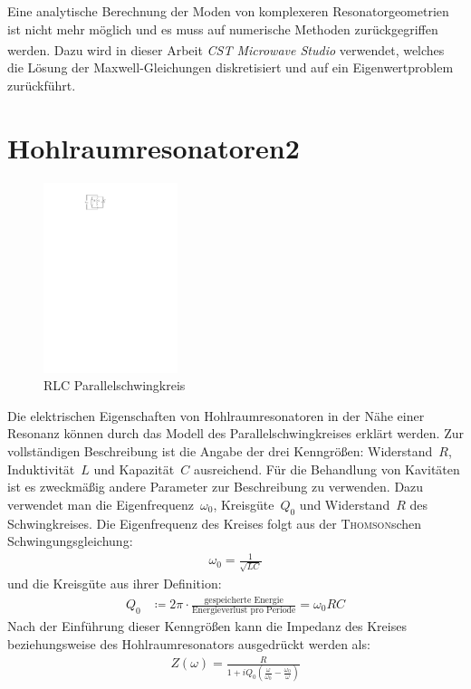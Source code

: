 \documentclass[11pt, a4paper]{scrbook}
\begin{document}
	Eine analytische Berechnung der Moden von komplexeren Resonatorgeometrien ist nicht mehr möglich und es muss auf numerische Methoden zurückgegriffen werden.
	Dazu wird in dieser Arbeit \emph{CST Microwave Studio\textsuperscript{\textregistered}} verwendet, welches die Lösung der Maxwell-Gleichungen diskretisiert und auf ein Eigenwertproblem zurückführt.
	
	\section{Hohlraumresonatoren2}
	\begin{figure}[h]
		\centering
		\includegraphics[width=0.35\textwidth]{./figures/RLC_circuit.pdf}
		\caption{RLC Parallelschwingkreis}
		\label{fig:rlc_circuit}
	\end{figure}
	Die elektrischen Eigenschaften von Hohlraumresonatoren in der Nähe einer Resonanz können durch das Modell des Parallelschwingkreises erklärt werden.
	Zur vollständigen Beschreibung ist die Angabe der drei Kenngrößen: Widerstand~$R$, Induktivität~$L$ und Kapazität~$C$ ausreichend.
	Für die Behandlung von Kavitäten ist es zweckmäßig andere Parameter zur Beschreibung zu verwenden.
	Dazu verwendet man die Eigenfrequenz~$\omega_0$, Kreisgüte~$Q_0$ und Widerstand~$R$ des Schwingkreises.
	Die Eigenfrequenz des Kreises folgt aus der \textsc{Thomson}schen Schwingungsgleichung:
	\begin{align}
		\omega_0 = \frac{1}{\sqrt{L C}}
	\end{align}
	und die Kreisgüte aus ihrer Definition:
	\begin{align}
		Q_0 &\coloneqq 2\pi \cdot \frac{\text{gespeicherte Energie}}{\text{Energieverlust pro Periode}} = \omega_0 R C
	\end{align}
	Nach der Einführung dieser Kenngrößen kann die Impedanz des Kreises beziehungsweise des Hohlraumresonators ausgedrückt werden als:
	\begin{align}
		Z(\omega) = \frac{R}{1 + i Q_0 \left( \frac{\omega}{\omega_0}  - \frac{\omega_0}{\omega}\right)}
	\end{align}
	
\end{document}
